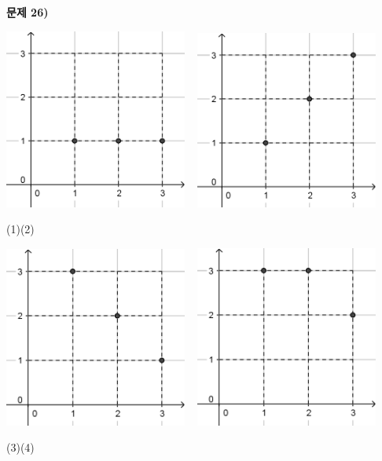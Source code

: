 \documentclass{oblivoir}
\newcommand\an[1]{\par\bigskip\noindent\textbf{문제 #1)}\\}
\begin{document}
\begin{minipage}{0.49\textwidth}
%
\an{26}
\begin{center}
\includegraphics[width=0.45\textwidth]{3by3_1}
~
\includegraphics[width=0.45\textwidth]{3by3_2}
\par\noindent(1)\qquad\qquad\qquad\quad\:\:(2)\par\noindent
\includegraphics[width=0.45\textwidth]{3by3_3}
~
\includegraphics[width=0.45\textwidth]{3by3_4}
\par\noindent(3)\qquad\qquad\qquad\quad\:\:(4)
\end{center}
\end{minipage}
\end{document}
